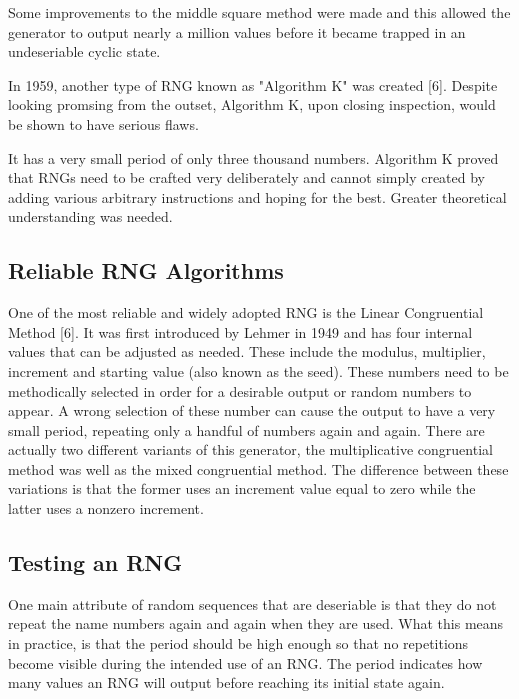 \documentclass{article}
\begin{document}
    Some improvements to the middle square method were made and this allowed
    the generator to output nearly a million values before it became trapped
    in an undeseriable cyclic state.

    In 1959, another type of RNG known as "Algorithm K" was created [6].
    Despite looking promsing from the outset, Algorithm K, upon closing inspection,
    would be shown to have serious flaws.

    It has a very small period of only three thousand numbers.
    Algorithm K proved that RNGs need to be crafted very deliberately and cannot simply
    created by adding various arbitrary instructions and hoping for the best.
    Greater theoretical understanding was needed.
        
    \subsection{Reliable RNG Algorithms}

    One of the most reliable and widely adopted RNG is the Linear Congruential Method [6].
    It was first introduced by Lehmer in 1949 and has four internal values
    that can be adjusted as needed. These include the modulus, multiplier, increment
    and starting value (also known as the seed). These numbers need
    to be methodically selected in order for a desirable output or random numbers to appear.
    A wrong selection of these number can cause the output to have a very small period,
    repeating only a handful of numbers again and again.
    There are actually two different variants of this generator, the multiplicative congruential
    method was well as the mixed congruential method. The difference
    between these variations is that the former uses an increment value equal to zero while
    the latter uses a nonzero increment.

    \subsection{Testing an RNG}

    One main attribute of random sequences that are deseriable is that they do
    not repeat the name numbers again and again when they are used.
    What this means in practice, is that the period should be high enough so
    that no repetitions become visible during the intended use of an RNG.
    The period indicates how many values an RNG will output before reaching its
    initial state again.
\end{document}
